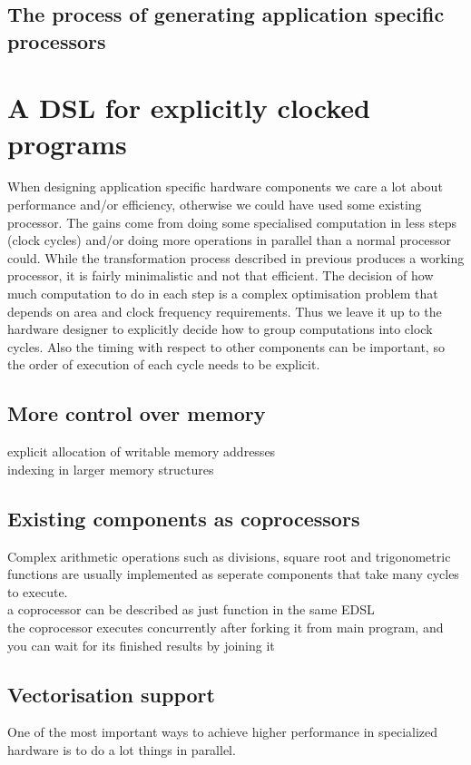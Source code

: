 \documentclass[preprint]{sigplanconf}
\begin{document}
\subsection{The process of generating application specific processors}


\section{A DSL for explicitly clocked programs}
When designing application specific hardware components we care a lot about performance and/or efficiency, otherwise we could have used some existing processor.
The gains come from doing some specialised computation in less steps (clock cycles) and/or doing more operations in parallel than a normal processor could.
While the transformation process described in previous produces a working processor, it is fairly minimalistic and not that efficient.
The decision of how much computation to do in each step is a complex optimisation problem that depends on area and clock frequency requirements.
Thus we leave it up to the hardware designer to explicitly decide how to group computations into clock cycles.
Also the timing with respect to other components can be important, so the order of execution of each cycle needs to be explicit.

\subsection{More control over memory}
explicit allocation of writable memory addresses\\
indexing in larger memory structures

\subsection{Existing components as coprocessors}
Complex arithmetic operations such as divisions, square root and trigonometric functions are usually implemented as seperate components that take many cycles to execute. \\
a coprocessor can be described as just function in the same EDSL \\
the coprocessor executes concurrently after forking it from main program, and you can wait for its finished results by joining it

\subsection{Vectorisation support}
One of the most important ways to achieve higher performance in specialized hardware is to do a lot things in parallel.
\end{document}
